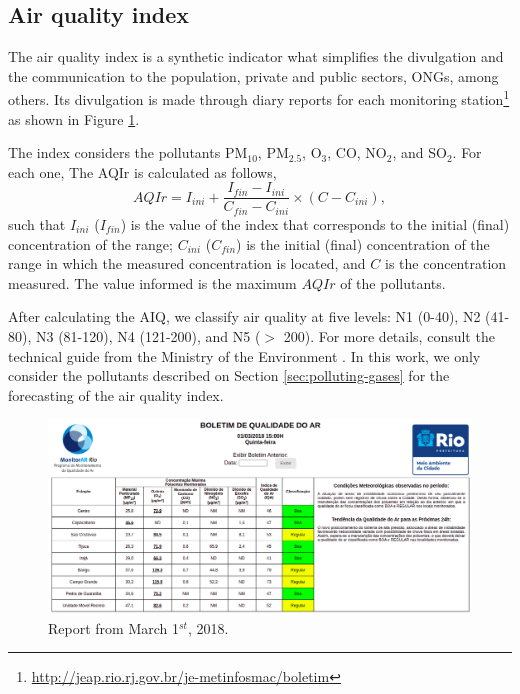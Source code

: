 \subsection{Air quality index}
\label{sec:aiq}

The air quality index is a synthetic indicator what simplifies the divulgation
and the communication to the population, private and public sectors, ONGs,
among others.
Its divulgation is made through diary reports for each monitoring
station\footnote{\url{http://jeap.rio.rj.gov.br/je-metinfosmac/boletim}} as
shown in Figure \ref{fig:boletim}. 

The index considers the pollutants PM$_{10}$, PM$_{2.5}$, O$_3$,
CO, NO$_2$, and SO$_2$. For each one, The AQIr is calculated as follows,
\begin{equation}
    \label{eq:AQI}
    AQIr = I_{ini} + \frac{I_{fin} - I_{ini}}{C_{fin} - C_{ini}} \times (C - C_{ini}), 
\end{equation}
such that $I_{ini}$ ($I_{fin}$) is the value of the index that corresponds to
the initial (final) concentration of the range; $C_{ini}$ ($C_{fin}$) is the
initial (final) concentration of the range in which the measured concentration
is located, and $C$ is the concentration measured. The value informed is the
maximum $AQIr$ of the pollutants. 

After calculating the AIQ, we classify air quality at five levels: N1 (0-40),
N2 (41-80), N3 (81-120), N4 (121-200), and N5 ($>$ 200). For more details,
consult the technical guide from the Ministry of the Environment
\cite{guia-tecnico-mma}. In this work, we only consider the pollutants
described on Section \ref{sec:polluting-gases} for the forecasting of the air
quality index. 

\begin{figure}[!ht]  
    \includegraphics[width=\linewidth]{../images/boletim01-03-2018.png}
    \caption{Report from March 1$^{st}$, 2018.}
    \label{fig:boletim}
\end{figure}



